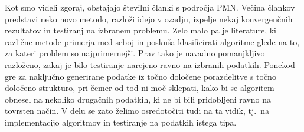 Kot smo videli zgoraj, obstajajo številni članki s področja PMN. Večina člankov predstavi neko novo metodo, razloži idejo v ozadju, izpelje nekaj konvergenčnih rezultatov in testiranj na izbranem problemu.
Zelo malo pa je literature, ki različne metode primerja med seboj in poskuša klasificirati algoritme glede na to, za kateri problem so najprimernejši. Prav tako je navadno pomanjkljivo razloženo, zakaj je bilo testiranje narejeno ravno na izbranih podatkih. Ponekod gre za naključno generirane podatke iz točno določene porazdelitve s točno določeno strukturo, pri čemer od tod ni moč sklepati, kako bi se algoritem obnesel na nekoliko drugačnih podatkih, ki ne bi bili pridobljeni ravno na tovrsten način. V delu se zato želimo osredotočiti tudi na ta vidik, tj.\ na implementacijo algoritmov in testiranje na podatkih istega tipa.
